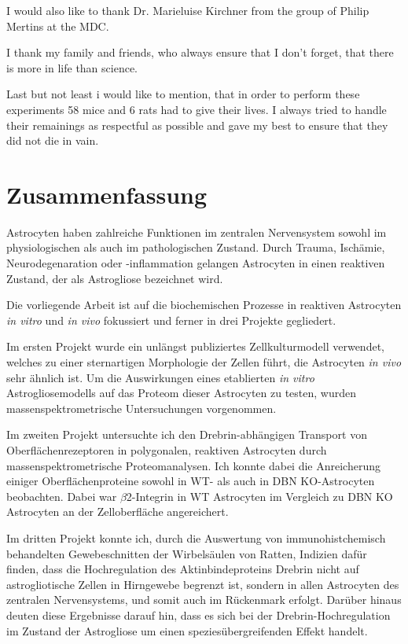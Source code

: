 \documentclass[a4paper,11pt,bibtotocnumbered]{article}
\begin{document}
I would also like to thank Dr. Marieluise Kirchner from the group of Philip Mertins at the MDC. 

I thank my family and friends, who always ensure that I don't forget, that there is more in life than science. 
 
Last but not least i would like to mention, that in order to perform these experiments 58 mice and 6 rats had to give their lives. I always tried to handle their remainings as respectful as possible and gave my best to ensure that they did not die in vain.



\newpage
\section{Zusammenfassung}

Astrocyten haben zahlreiche Funktionen im zentralen Nervensystem sowohl im physiologischen als auch im pathologischen Zustand. Durch Trauma, Ischämie, Neurodegenaration oder -inflammation gelangen Astrocyten in einen reaktiven Zustand, der als Astrogliose bezeichnet wird.

Die vorliegende Arbeit ist auf die biochemischen Prozesse in reaktiven Astrocyten \textit{in vitro} und \textit{in vivo} fokussiert und ferner in drei Projekte gegliedert.

Im ersten Projekt wurde ein unlängst publiziertes Zellkulturmodell verwendet, welches zu einer sternartigen Morphologie der Zellen führt, die Astrocyten \textit{in vivo} sehr ähnlich ist. Um die Auswirkungen eines etablierten \textit{in vitro} Astrogliosemodells auf das Proteom dieser Astrocyten zu testen, wurden massenspektrometrische Untersuchungen vorgenommen.     

Im zweiten Projekt untersuchte ich den Drebrin-abhängigen Transport von Oberflächenrezeptoren in polygonalen, reaktiven Astrocyten durch massenspektrometrische Proteomanalysen. Ich konnte dabei die Anreicherung einiger Oberflächenproteine sowohl in WT- als auch in DBN KO-Astrocyten beobachten. Dabei war $\beta$2-Integrin in WT Astrocyten im Vergleich zu DBN KO Astrocyten an der Zelloberfläche angereichert.

Im dritten Projekt konnte ich, durch die Auswertung von immunohistchemisch behandelten Gewebeschnitten der Wirbelsäulen von Ratten, Indizien dafür finden, dass die Hochregulation des Aktinbindeproteins Drebrin nicht auf astrogliotische Zellen in Hirngewebe begrenzt ist, sondern in allen Astrocyten des zentralen Nervensystems, und somit auch im Rückenmark erfolgt. Darüber hinaus deuten diese Ergebnisse darauf hin, dass es sich bei der Drebrin-Hochregulation im Zustand der Astrogliose um einen speziesübergreifenden Effekt handelt.     
\end{document}
